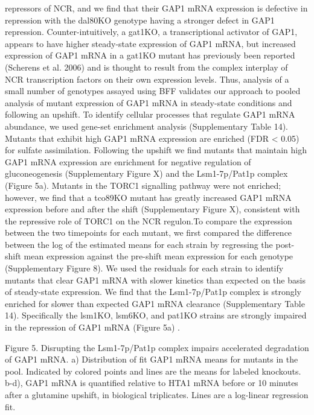 repressors of NCR, and we find that their GAP1 mRNA expression is
defective in repression with the dal80KO genotype having a stronger
defect in GAP1 repression. Counter-intuitively, a gat1KO, a
transcriptional activator of GAP1, appears to have higher steady-state
expression of GAP1 mRNA, but increased expression of GAP1 mRNA in a
gat1KO mutant has previously been reported (Scherens et al. 2006) and
is thought to result from the complex interplay of NCR transcription
factors on their own expression levels. Thus, analysis of a small
number of genotypes assayed using BFF validates our approach to pooled
analysis of mutant expression of GAP1 mRNA in steady-state conditions
and following an upshift.  To identify cellular processes that
regulate GAP1 mRNA abundance, we used gene-set enrichment analysis
(Supplementary Table 14). Mutants that exhibit high GAP1 mRNA
expression are enriched (FDR < 0.05) for sulfate assimilation.
Following the upshift we find mutants that maintain high GAP1 mRNA
expression are enrichment for negative regulation of gluconeogenesis
(Supplementary Figure X) and the Lsm1-7p/Pat1p complex (Figure 5a).
Mutants in the TORC1 signalling pathway were not enriched; however, we
find that a tco89KO mutant has  greatly increased GAP1 mRNA expression
before and after the shift (Supplementary Figure X), consistent with
the repressive role of TORC1 on the NCR regulon.To compare the
expression between the two timepoints for each mutant, we first
compared the difference between the log of the estimated means for
each strain by regressing the post-shift mean expression against the
pre-shift mean expression for each genotype (Supplementary Figure 8).
We used the residuals for each strain to identify mutants that clear
GAP1 mRNA with slower kinetics than expected on the basis of
steady-state expression.  We find that the Lsm1-7p/Pat1p complex is
strongly enriched for slower than expected GAP1 mRNA clearance
(Supplementary Table 14). Specifically the lsm1KO, lsm6KO, and pat1KO
strains are strongly impaired in the repression of GAP1 mRNA (Figure
5a) .
  

Figure 5. Disrupting the Lsm1-7p/Pat1p complex impairs accelerated
degradation of  GAP1 mRNA.  a) Distribution of fit GAP1 mRNA means for
mutants in the pool. Indicated by colored points and lines are the
means for labeled knockouts. b-d), GAP1 mRNA is quantified relative to
HTA1 mRNA before or 10 minutes after a glutamine upshift, in
biological triplicates. Lines are a log-linear regression fit.


